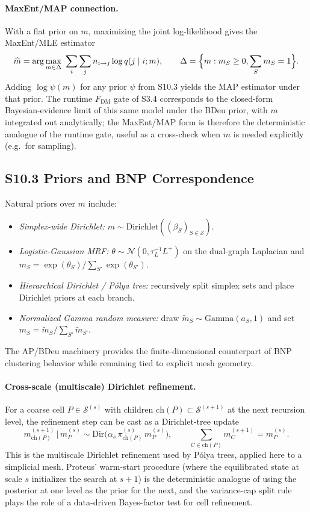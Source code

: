 \documentclass[11pt]{article}
\begin{document}
\paragraph{MaxEnt/MAP connection.}
With a flat prior on $m$, maximizing the joint log-likelihood gives the MaxEnt/MLE estimator
\[
\widehat m
=
\arg\max_{m\in\Delta}\
\sum_{i}\sum_{j}
n_{i\to j}\log q(j\mid i;m),
\qquad
\Delta=\Bigl\{m:m_S\ge0,\sum_S m_S=1\Bigr\}.
\]
Adding $\log\psi(m)$ for any prior $\psi$ from S10.3 yields the MAP estimator under that prior. The runtime $F_{\mathrm{DM}}$ gate of S3.4 corresponds to the closed-form Bayesian-evidence limit of this same model under the BDeu prior, with $m$ integrated out analytically; the MaxEnt/MAP form is therefore the deterministic analogue of the runtime gate, useful as a cross-check when $m$ is needed explicitly (e.g.\ for sampling).

\subsection*{S10.3 Priors and BNP Correspondence}
Natural priors over $m$ include:
\begin{itemize}[leftmargin=1.5em]
  \item \emph{Simplex-wide Dirichlet:} $m\sim\mathrm{Dirichlet}((\beta_S)_{S\in\mathcal S})$.
  \item \emph{Logistic-Gaussian MRF:} $\theta\sim\mathcal N(0,\tau_L^{-1}L^+)$ on the dual-graph Laplacian and $m_S=\exp(\theta_S)/\sum_{S'}\exp(\theta_{S'})$.
  \item \emph{Hierarchical Dirichlet / P\'olya tree:} recursively split simplex sets and place Dirichlet priors at each branch.
  \item \emph{Normalized Gamma random measure:} draw $\tilde m_S\sim\mathrm{Gamma}(a_S,1)$ and set $m_S=\tilde m_S/\sum_{S'}\tilde m_{S'}$.
\end{itemize}
The AP/BDeu machinery provides the finite-dimensional counterpart of BNP clustering behavior while remaining tied to explicit mesh geometry.

\paragraph{Cross-scale (multiscale) Dirichlet refinement.}
For a coarse cell $P\in\mathcal S^{(s)}$ with children $\mathrm{ch}(P)\subset\mathcal S^{(s+1)}$ at the next recursion level, the refinement step can be cast as a Dirichlet-tree update
\[
m^{(s+1)}_{\mathrm{ch}(P)}\,\big|\,m^{(s)}_P
\sim
\mathrm{Dir}\bigl(\alpha_s\,\pi^{(s)}_{\mathrm{ch}(P)}\,m^{(s)}_P\bigr),
\qquad
\sum_{C\in\mathrm{ch}(P)}m^{(s+1)}_C=m^{(s)}_P.
\]
This is the multiscale Dirichlet refinement used by P\'olya trees, applied here to a simplicial mesh. Proteus' warm-start procedure (where the equilibrated state at scale $s$ initializes the search at $s{+}1$) is the deterministic analogue of using the posterior at one level as the prior for the next, and the variance-cap split rule plays the role of a data-driven Bayes-factor test for cell refinement.
\end{document}
